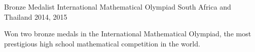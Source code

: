 


\begin{cventries}


	\cventry
	{Bronze Medalist} %
	{International Mathematical Olympiad} %
	{South Africa and Thailand} %
	{2014, 2015} %
	{ %
		\begin{cvitems}
		\item {Won two bronze medals in the International Mathematical Olympiad, the most prestigious high school mathematical competition in the world.}
		\end{cvitems}
	}

\end{cventries}
